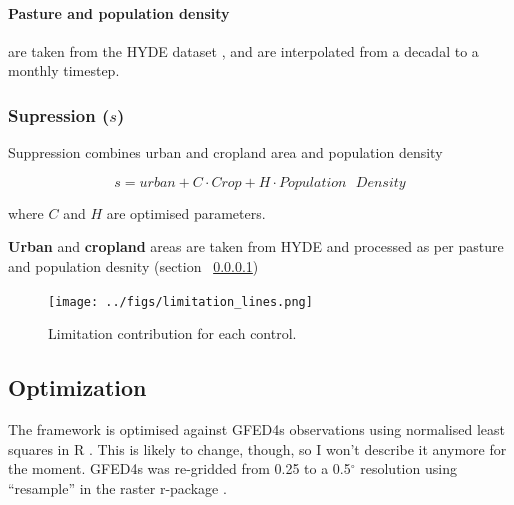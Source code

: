 \paragraph{Pasture and population density}
\label{Pasture}
are taken from the HYDE dataset \citep{klein2007mapping}, and are interpolated from a decadal to a monthly timestep.

\subsubsection{Supression ($s$)}

Suppression combines urban and cropland area and population density

\begin{equation}
    s = urban + C \cdot Crop + H \cdot Population\text{ }Density
    \label{equ:Supression}
\end{equation}

where $C$ and $H$ are optimised parameters.

\textbf{Urban} and \textbf{cropland} areas are taken from HYDE and processed as per pasture and population desnity (section ~\ref{Pasture})


\begin{figure}[!ht]
\begin{shaded}
  \centering
    \texttt{[image: ../figs/limitation\_lines.png]}

  \caption{Limitation contribution for each control.}
  \label{fig:lim_lines}
\end{shaded}

\end{figure}
\subsection{Optimization}

\begin{shaded}
    The framework is optimised against GFED4s observations \citep{Giglio2013}  using normalised least squares in R \citep{rstats}.  This is likely to change, though, so I won't describe it anymore for the moment. GFED4s was re-gridded from 0.25 to a 0.5$^{\circ}$ resolution using ``resample'' in the raster r-package \citep{rraster}.
\end{shaded}

